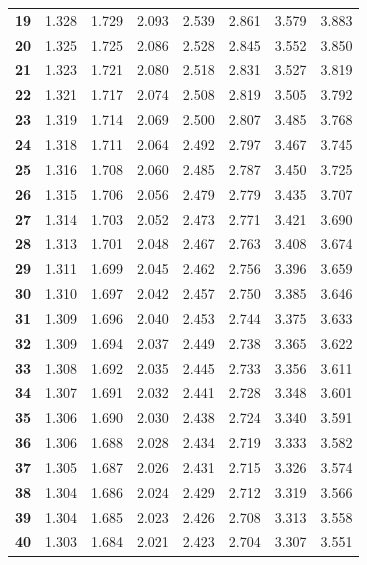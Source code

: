 \begin{center}
\begin{tabular}{c|c|c|c|c|c|c|c}
\textbf{19} & 1.328 & 1.729 & 2.093  & 2.539  & 2.861  & 3.579   & 3.883   \\
\textbf{20} & 1.325 & 1.725 & 2.086  & 2.528  & 2.845  & 3.552   & 3.850   \\
\textbf{21} & 1.323 & 1.721 & 2.080  & 2.518  & 2.831  & 3.527   & 3.819   \\
\textbf{22} & 1.321 & 1.717 & 2.074  & 2.508  & 2.819  & 3.505   & 3.792   \\
\textbf{23} & 1.319 & 1.714 & 2.069  & 2.500  & 2.807  & 3.485   & 3.768   \\
\textbf{24} & 1.318 & 1.711 & 2.064  & 2.492  & 2.797  & 3.467   & 3.745   \\
\textbf{25} & 1.316 & 1.708 & 2.060  & 2.485  & 2.787  & 3.450   & 3.725   \\
\textbf{26} & 1.315 & 1.706 & 2.056  & 2.479  & 2.779  & 3.435   & 3.707   \\
\textbf{27} & 1.314 & 1.703 & 2.052  & 2.473  & 2.771  & 3.421   & 3.690   \\
\textbf{28} & 1.313 & 1.701 & 2.048  & 2.467  & 2.763  & 3.408   & 3.674   \\
\textbf{29} & 1.311 & 1.699 & 2.045  & 2.462  & 2.756  & 3.396   & 3.659   \\
\textbf{30} & 1.310 & 1.697 & 2.042  & 2.457  & 2.750  & 3.385   & 3.646   \\
\textbf{31} & 1.309 & 1.696 & 2.040  & 2.453  & 2.744  & 3.375   & 3.633   \\
\textbf{32} & 1.309 & 1.694 & 2.037  & 2.449  & 2.738  & 3.365   & 3.622   \\
\textbf{33} & 1.308 & 1.692 & 2.035  & 2.445  & 2.733  & 3.356   & 3.611   \\
\textbf{34} & 1.307 & 1.691 & 2.032  & 2.441  & 2.728  & 3.348   & 3.601   \\
\textbf{35} & 1.306 & 1.690 & 2.030  & 2.438  & 2.724  & 3.340   & 3.591   \\
\textbf{36} & 1.306 & 1.688 & 2.028  & 2.434  & 2.719  & 3.333   & 3.582   \\
\textbf{37} & 1.305 & 1.687 & 2.026  & 2.431  & 2.715  & 3.326   & 3.574   \\
\textbf{38} & 1.304 & 1.686 & 2.024  & 2.429  & 2.712  & 3.319   & 3.566   \\
\textbf{39} & 1.304 & 1.685 & 2.023  & 2.426  & 2.708  & 3.313   & 3.558   \\
\textbf{40} & 1.303 & 1.684 & 2.021  & 2.423  & 2.704  & 3.307   & 3.551  \bstrut\\
\hline
\end{tabular}
\end{center}

\clearpage %